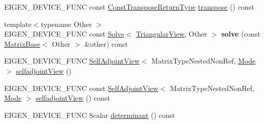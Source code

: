 \begin{DoxyCompactItemize}
\item 
E\+I\+G\+E\+N\+\_\+\+D\+E\+V\+I\+C\+E\+\_\+\+F\+U\+NC const \mbox{\hyperlink{class_eigen_1_1_triangular_view}{Const\+Transpose\+Return\+Type}} \mbox{\hyperlink{class_eigen_1_1_triangular_view_a202b574fc82f1433989c3ae35128451e}{transpose}} () const
\item 
\mbox{\label{class_eigen_1_1_triangular_view_a66abd75705f5020d2a31895a5be9e5a4}} 
{\footnotesize template$<$typename Other $>$ }\\E\+I\+G\+E\+N\+\_\+\+D\+E\+V\+I\+C\+E\+\_\+\+F\+U\+NC const \mbox{\hyperlink{class_eigen_1_1_solve}{Solve}}$<$ \mbox{\hyperlink{class_eigen_1_1_triangular_view}{Triangular\+View}}, Other $>$ {\bfseries solve} (const \mbox{\hyperlink{class_eigen_1_1_matrix_base}{Matrix\+Base}}$<$ Other $>$ \&other) const
\item 
E\+I\+G\+E\+N\+\_\+\+D\+E\+V\+I\+C\+E\+\_\+\+F\+U\+NC \mbox{\hyperlink{class_eigen_1_1_self_adjoint_view}{Self\+Adjoint\+View}}$<$ Matrix\+Type\+Nested\+Non\+Ref, \mbox{\hyperlink{struct_mode}{Mode}} $>$ \mbox{\hyperlink{class_eigen_1_1_triangular_view_a1fe2e5e93164b2efb5124297b096fb10}{selfadjoint\+View}} ()
\item 
E\+I\+G\+E\+N\+\_\+\+D\+E\+V\+I\+C\+E\+\_\+\+F\+U\+NC const \mbox{\hyperlink{class_eigen_1_1_self_adjoint_view}{Self\+Adjoint\+View}}$<$ Matrix\+Type\+Nested\+Non\+Ref, \mbox{\hyperlink{struct_mode}{Mode}} $>$ \mbox{\hyperlink{class_eigen_1_1_triangular_view_ade4c489f8fb9f5e31d3c3a64e19c166a}{selfadjoint\+View}} () const
\item 
E\+I\+G\+E\+N\+\_\+\+D\+E\+V\+I\+C\+E\+\_\+\+F\+U\+NC Scalar \mbox{\hyperlink{class_eigen_1_1_triangular_view_a39806fdec7a2a1a869e904c31ee8c67c}{determinant}} () const
\end{DoxyCompactItemize}
